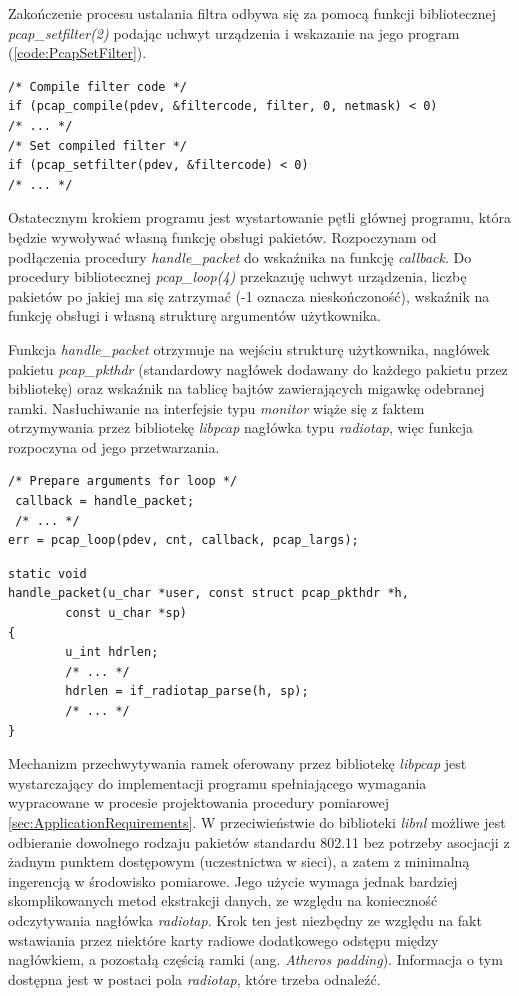 Zakończenie procesu ustalania filtra odbywa się za pomocą funkcji bibliotecznej \emph{pcap\_setfilter(2)} podając uchwyt urządzenia i wskazanie na jego program (\ref{code:PcapSetFilter}).

\begin{lstlisting}[frame=tb]
/* Compile filter code */
if (pcap_compile(pdev, &filtercode, filter, 0, netmask) < 0)
/* ... */
/* Set compiled filter */ 
if (pcap_setfilter(pdev, &filtercode) < 0)
/* ... */
\end{lstlisting}

Ostatecznym krokiem programu jest wystartowanie pętli głównej programu, która będzie wywoływać własną funkcję obsługi pakietów. Rozpoczynam od podłączenia procedury \emph{handle\_packet} do wskaźnika na funkcję \emph{callback}. Do procedury bibliotecznej \emph{pcap\_loop(4)} przekazuję uchwyt urządzenia, liczbę pakietów po jakiej ma się zatrzymać (-1 oznacza nieskończoność), wskaźnik na funkcję obsługi i własną strukturę argumentów użytkownika. 

Funkcja \emph{handle\_packet} otrzymuje na wejściu strukturę użytkownika, nagłówek pakietu \emph{pcap\_pkthdr} (standardowy nagłówek dodawany do każdego pakietu przez bibliotekę) oraz wskaźnik na tablicę bajtów zawierających migawkę odebranej ramki. Nasłuchiwanie na interfejsie typu \emph{monitor} wiąże się z faktem otrzymywania przez bibliotekę \emph{libpcap} nagłówka typu \emph{radiotap}, więc funkcja rozpoczyna od jego przetwarzania. 


\begin{lstlisting}[frame=tb]
 /* Prepare arguments for loop */
 callback = handle_packet;
 /* ... */
err = pcap_loop(pdev, cnt, callback, pcap_largs);
\end{lstlisting}

\begin{lstlisting}[frame=tb]
static void
handle_packet(u_char *user, const struct pcap_pkthdr *h, 
        const u_char *sp)
{
        u_int hdrlen;
        /* ... */
        hdrlen = if_radiotap_parse(h, sp);
        /* ... */
}
\end{lstlisting}

Mechanizm przechwytywania ramek oferowany przez bibliotekę \emph{libpcap} jest wystarczający do implementacji programu spełniającego wymagania wypracowane w procesie projektowania procedury pomiarowej \ref{sec:ApplicationRequirements}. W przeciwieństwie do biblioteki \emph{libnl} możliwe jest odbieranie dowolnego rodzaju pakietów standardu 802.11 bez potrzeby asocjacji z żadnym punktem dostępowym (uczestnictwa w sieci), a zatem z minimalną ingerencją w środowisko pomiarowe. Jego użycie wymaga jednak bardziej skomplikowanych metod ekstrakcji danych, ze względu na konieczność odczytywania nagłówka \emph{radiotap}. Krok ten jest niezbędny ze względu na fakt wstawiania przez niektóre karty radiowe dodatkowego odstępu między nagłówkiem, a pozostałą częścią ramki (ang. \emph{Atheros padding}). Informacja o tym dostępna jest w postaci pola \emph{radiotap}, które trzeba odnaleźć.

